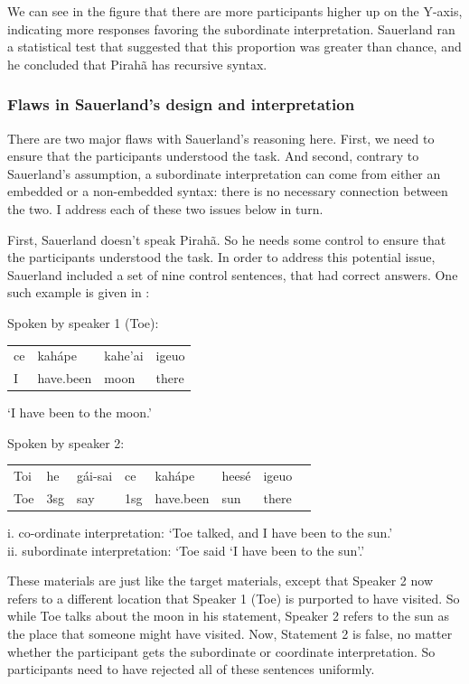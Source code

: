 \documentclass{article}
\begin{document}
We can see in the figure that there are more participants higher up on the Y-axis, indicating more responses favoring the subordinate interpretation. Sauerland ran a statistical test that suggested that this proportion was greater than chance, and he concluded that Pirahã has recursive syntax.

\subsubsection{Flaws in Sauerland's design and interpretation}

There are two major flaws with Sauerland’s reasoning here. First, we need to ensure that the participants understood the task. And second, contrary to Sauerland's assumption, a subordinate interpretation can come from either an embedded or a non-embedded syntax: there is no necessary connection between the two.  I address each of these two issues below in turn.

First, Sauerland doesn't speak Pirahã. So he needs some control to ensure that the participants understood the task. In order to address this potential issue, Sauerland included a set of nine control sentences, that had correct answers.  One such example is given in :

\eal
\label{sauerland_ex_cont}
\ex \label{sauerland_ex1_cont} Spoken by speaker 1 (Toe):\\
\begin{tabular}{@{}l l l l}
ce & kahápe & kahe’ai & igeuo \\ 
I & have.been & moon & there\\
\end{tabular}

`I have been to the moon.'

\ex \label{sauerland_ex2_cont} Spoken by speaker 2:\\
\begin{tabular}{@{}l l l l l l l l}
Toi & he & gái-sai & ce & kahápe & heesé & igeuo \\
Toe & 3sg & say & 1sg & have.been & sun & there\\
\end{tabular}

i. co-ordinate interpretation: `Toe talked, and I have been to the sun.'\\
ii. subordinate interpretation: `Toe said ‘I have been to the sun’.'
\zl

These materials are just like the target materials, except that Speaker 2 now refers to a different location that Speaker 1 (Toe) is purported to have visited.  So while Toe talks about the moon in his statement, Speaker 2 refers to the sun as the place that someone might have visited.  Now, Statement 2 is false, no matter whether the participant gets the subordinate or coordinate interpretation.  So participants need to have rejected all of these sentences uniformly.
\end{document}
